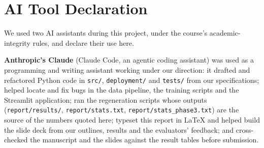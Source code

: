 \documentclass[12pt,a4paper]{article}
\newcommand{\code}[1]{\texttt{\small #1}}
\begin{document}
\tableofcontents
\clearpage
{}













\label{sec:bodyend}
\clearpage


\clearpage
\appendix

\clearpage

\clearpage

\clearpage


\clearpage
\section*{AI Tool Declaration}

We used two AI assistants during this project, under the course's
academic-integrity rules, and declare their use here.

\textbf{Anthropic's Claude} (Claude Code, an agentic coding assistant) was used
as a programming and writing assistant working under our direction: it drafted
and refactored Python code in \code{src/}, \code{deployment/} and \code{tests/}
from our specifications; helped locate and fix bugs in the data pipeline, the
training scripts and the Streamlit application; ran the regeneration scripts
whose outputs (\code{report/results/}, \code{report/stats.txt},
\code{report/stats\_phase3.txt}) are the source of the numbers quoted here; typeset this report in \LaTeX{} and helped
build the slide deck from our outlines, results and the evaluators' feedback;
and cross-checked the manuscript and the slides against the result tables
before submission.
\end{document}
